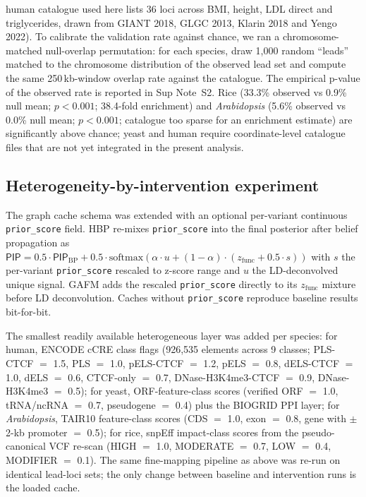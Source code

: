 human catalogue used here lists 36 loci across BMI, height, LDL
direct and triglycerides, drawn from GIANT 2018, GLGC 2013, Klarin
2018 and Yengo 2022). To calibrate the validation rate against
chance, we ran a chromosome-matched null-overlap permutation: for
each species, draw 1{,}000 random ``leads'' matched to the
chromosome distribution of the observed lead set and compute the
same 250\,kb-window overlap rate against the catalogue. The
empirical p-value of the observed rate is reported in Sup Note~S2.
Rice (33.3\% observed vs 0.9\% null mean; $p<0.001$; 38.4-fold
enrichment) and \emph{Arabidopsis} (5.6\% observed vs 0.0\% null
mean; $p<0.001$; catalogue too sparse for an enrichment estimate)
are significantly above chance; yeast and human require
coordinate-level catalogue files that are not yet integrated in
the present analysis.

\subsection*{Heterogeneity-by-intervention experiment}\label{methods:intervention}

The graph cache schema was extended with an optional per-variant
continuous \texttt{prior\_score} field. HBP re-mixes
\texttt{prior\_score} into the final posterior after belief
propagation as $\textsf{PIP} = 0.5 \cdot \textsf{PIP}_{\text{BP}} +
0.5 \cdot \mathrm{softmax}(\alpha \cdot u + (1-\alpha) \cdot
(z_{\text{func}} + 0.5 \cdot s))$ with $s$ the per-variant
\texttt{prior\_score} rescaled to z-score range and $u$ the
LD-deconvolved unique signal. GAFM adds the rescaled
\texttt{prior\_score} directly to its $z_{\text{func}}$ mixture
before LD deconvolution. Caches without
\texttt{prior\_score} reproduce baseline results bit-for-bit.

The smallest readily available heterogeneous layer was added per
species: for human, ENCODE cCRE class flags (926{,}535 elements
across 9 classes; PLS-CTCF $=$ 1.5, PLS $=$ 1.0, pELS-CTCF $=$ 1.2,
pELS $=$ 0.8, dELS-CTCF $=$ 1.0, dELS $=$ 0.6, CTCF-only $=$ 0.7,
DNase-H3K4me3-CTCF $=$ 0.9, DNase-H3K4me3 $=$ 0.5);
for yeast, ORF-feature-class scores (verified ORF $=$ 1.0,
tRNA/ncRNA $=$ 0.7, pseudogene $=$ 0.4) plus the BIOGRID PPI layer;
for \emph{Arabidopsis}, TAIR10 feature-class scores
(CDS $=$ 1.0, exon $=$ 0.8, gene with $\pm$2-kb promoter $=$ 0.5);
for rice, snpEff impact-class scores from the pseudo-canonical
VCF re-scan (HIGH $=$ 1.0, MODERATE $=$ 0.7, LOW $=$ 0.4,
MODIFIER $=$ 0.1). The same fine-mapping pipeline as above was
re-run on identical lead-loci sets; the only change between
baseline and intervention runs is the loaded cache.

